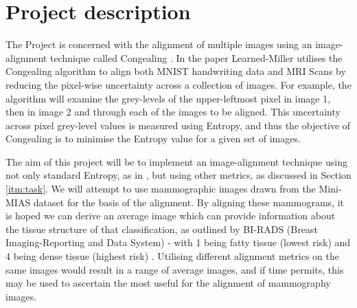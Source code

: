 \documentclass[11pt,fleqn,twoside]{article}
\begin{document}
\wordcount{}

\mmp

\setcounter{tocdepth}{3} %


\section{Project description}

The Project is concerned with the alignment of multiple images using an image-alignment technique called Congealing \cite{joint-alignment}. In the paper Learned-Miller utilises the Congealing algorithm to align both MNIST handwriting data and MRI Scans by reducing the pixel-wise uncertainty across a collection of images. For example, the algorithm will examine the grey-levels of the upper-leftmost pixel in image 1, then in image 2 and through each of the images to be aligned. This uncertainty across pixel grey-level values is measured using Entropy, and thus the objective of Congealing is to minimise the Entropy value for a given set of images. \par

The aim of this project will be to implement an image-alignment technique using not only standard Entropy, as in \cite{joint-alignment}, but using other metrics, as discussed in Section \ref{itm:task}. We will attempt to use mammographic images drawn from the Mini-MIAS dataset \cite{suckling1994mammographic} for the basis of the alignment. By aligning these mammograms, it is hoped we can derive an average image which can provide information about the tissue structure of that classification, as outlined by BI-RADS (Breast Imaging-Reporting and Data System) - with 1 being fatty tissue (lowest risk) and 4 being dense tissue (highest risk) \cite{bi-rads}. Utilising different alignment metrics on the same images would result in a range of average images, and if time permits, this may be used to ascertain the most useful for the alignment of mammography images. \par
\end{document}
